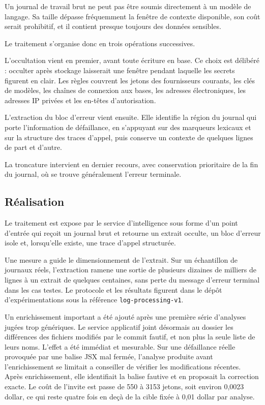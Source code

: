 \documentclass[12pt,a4paper,oneside]{report}
\begin{document}
Un journal de travail brut ne peut pas être soumis directement à un modèle de
langage. Sa taille dépasse fréquemment la fenêtre de contexte disponible, son
coût serait prohibitif, et il contient presque toujours des données sensibles.

Le traitement s'organise donc en trois opérations successives.

L'occultation vient en premier, avant toute écriture en base. Ce choix est
délibéré : occulter après stockage laisserait une fenêtre pendant laquelle les
secrets figurent en clair. Les règles couvrent les jetons des fournisseurs
courants, les clés de modèles, les chaînes de connexion aux bases, les adresses
électroniques, les adresses IP privées et les en-têtes d'autorisation.

L'extraction du bloc d'erreur vient ensuite. Elle identifie la région du journal
qui porte l'information de défaillance, en s'appuyant sur des marqueurs
lexicaux et sur la structure des traces d'appel, puis conserve un contexte de
quelques lignes de part et d'autre.

La troncature intervient en dernier recours, avec conservation prioritaire de la
fin du journal, où se trouve généralement l'erreur terminale.

\subsection{Réalisation}

Le traitement est expose par le service d'intelligence sous forme d'un point
d'entrée qui reçoit un journal brut et retourne un extrait occulte, un bloc
d'erreur isole et, lorsqu'elle existe, une trace d'appel structurée.

Une mesure a guide le dimensionnement de l'extrait. Sur un échantillon de
journaux réels, l'extraction ramene une sortie de plusieurs dizaines de milliers
de lignes à un extrait de quelques centaines, sans perte du message
d'erreur terminal dans les cas testes. Le protocole et les résultats figurent
dans le dépôt d'expérimentations sous la référence \texttt{log-processing-v1}.

Un enrichissement important a été ajouté après une première série d'analyses
jugées trop génériques. Le service applicatif joint désormais au dossier les
différences des fichiers modifiés par le commit fautif, et non plus la seule
liste de leurs noms. L'effet a été immédiat et mesurable. Sur une défaillance
réelle provoquée par une balise JSX mal fermée, l'analyse produite avant
l'enrichissement se limitait a conseiller de vérifier les modifications
récentes. Après enrichissement, elle identifiait la balise fautive et en
proposait la correction exacte. Le coût de l'invite est passe de 550 à 3153
jetons, soit environ 0,0023 dollar, ce qui reste quatre fois en deçà de la cible
fixée à 0,01 dollar par analyse.
\end{document}
